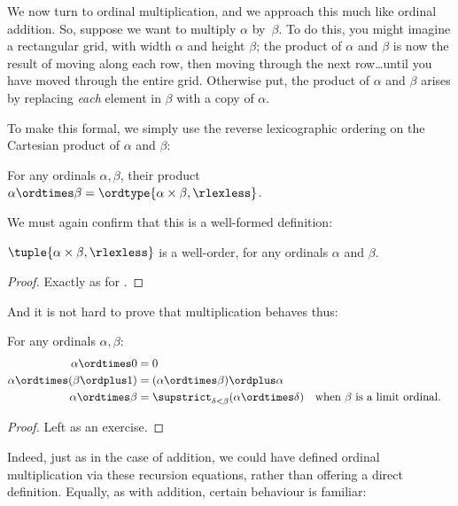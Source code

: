 \documentclass[../../../include/open-logic-section]{subfiles}
\begin{document}


We now turn to ordinal multiplication, and we approach this much like
ordinal addition. So, suppose we want to multiply $\alpha$ by~$\beta$.
To do this, you might imagine a rectangular grid, with width $\alpha$
and height $\beta$; the product of $\alpha$ and $\beta$ is now the
result of moving along each row, then moving through the next
row\ldots until you have moved through the entire grid. Otherwise put,
the product of $\alpha$ and $\beta$ arises by replacing \emph{each}
element in $\beta$ with a copy of $\alpha$.  

To make this formal, we simply use the reverse lexicographic ordering
on the Cartesian product of $\alpha$ and $\beta$:

\begin{defn}
For any ordinals $\alpha, \beta$, their product $\alpha \ordtimes \beta = \ordtype{\alpha \times \beta, \rlexless}$.
\end{defn}
\noindent
We must again confirm that this is a well-formed definition:

\begin{lem}
$\tuple{\alpha \times \beta, \rlexless}$ is a well-order, for any
ordinals $\alpha$ and $\beta$.
\end{lem}

\begin{proof}
Exactly as for .
\end{proof}
\noindent
And it is not hard to prove that multiplication behaves thus:

\begin{lem}
For any ordinals $\alpha, \beta$:
\begin{align*}
	\alpha \ordtimes 0 &= 0\\
	\alpha \ordtimes (\beta \ordplus 1) &= 
		(\alpha \ordtimes \beta) \ordplus \alpha\\
	\alpha  \ordtimes \beta &= 
		\supstrict_{\delta < \beta}(\alpha \ordtimes \delta) && 
		\text{when $\beta$ is a limit ordinal}.
\end{align*}
\end{lem}

\begin{proof}
Left as an exercise.
\end{proof}

Indeed, just as in the case of addition, we could have defined ordinal
multiplication via these recursion equations, rather than offering a
direct definition. Equally, as with addition, certain behaviour is
familiar:
\end{document}
